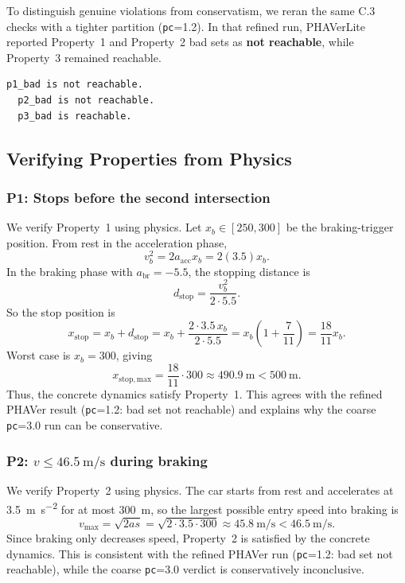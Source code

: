 \documentclass[10pt]{article}
\begin{document}
\noindent To distinguish genuine violations from conservatism, we reran the same C.3 checks with a tighter partition (\texttt{pc}=1.2). In that refined run, PHAVerLite reported Property~1 and Property~2 bad sets as \textbf{not reachable}, while Property~3 remained reachable.


\begin{lstlisting}[style=phaver,caption={C.3: PHAVerLite output summary for the three property checks with pc=1.2},label={fig:c3_output_12}]
  p1_bad is not reachable.
  p2_bad is not reachable.
  p3_bad is reachable.
  \end{lstlisting}

\subsection*{Verifying Properties from Physics}

\subsubsection*{P1: Stops before the second intersection}
We verify Property~1 using physics. Let $x_b\in[250,300]$ be the braking-trigger position. From rest in the acceleration phase,
\[
v_b^2 = 2a_{\mathrm{acc}}x_b = 2(3.5)x_b.
\]
In the braking phase with $a_{\mathrm{br}}=-5.5$, the stopping distance is
\[
d_{\mathrm{stop}}=\frac{v_b^2}{2\cdot 5.5}.
\]
So the stop position is
\[
x_{\mathrm{stop}} = x_b + d_{\mathrm{stop}}
= x_b + \frac{2\cdot 3.5\,x_b}{2\cdot 5.5}
= x_b\!\left(1+\frac{7}{11}\right)
= \frac{18}{11}x_b.
\]
Worst case is $x_b=300$, giving
\[
x_{\mathrm{stop,max}}=\frac{18}{11}\cdot 300\approx \SI{490.9}{\meter}<\SI{500}{\meter}.
\]
Thus, the concrete dynamics satisfy Property~1. This agrees with the refined PHAVer result (\texttt{pc}=1.2: bad set not reachable) and explains why the coarse \texttt{pc}=3.0 run can be conservative.

\subsubsection*{P2: $v \leq \SI{46.5}{\meter\per\second}$ during braking}
We verify Property~2 using physics. The car starts from rest and accelerates at \SI{3.5}{\meter\per\second\squared} for at most \SI{300}{\meter}, so the largest possible entry speed into braking is
\[
v_{\max}=\sqrt{2as}=\sqrt{2\cdot 3.5\cdot 300}\approx\SI{45.8}{\meter\per\second}<\SI{46.5}{\meter\per\second}.
\]
Since braking only decreases speed, Property~2 is satisfied by the concrete dynamics. This is consistent with the refined PHAVer run (\texttt{pc}=1.2: bad set not reachable), while the coarse \texttt{pc}=3.0 verdict is conservatively inconclusive.
\end{document}
